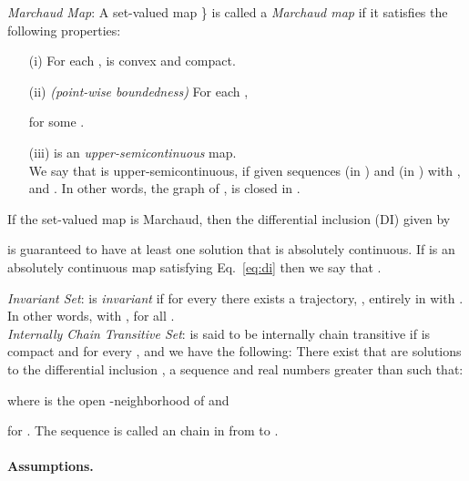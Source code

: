 \documentclass{article}
\begin{document}
\textit{Marchaud Map}: A set-valued map \}
is called a \textit{Marchaud map} if it satisfies
the following properties:
\begin{itemize}
 \item[(i)] For each ,  is convex and compact.
 \item[(ii)] \textit{(point-wise boundedness)} For each ,
 
for some .
 \item[(iii)]  is an \textit{upper-semicontinuous} map. \\ \indent
 We say that  is upper-semicontinuous,
  if given sequences  (in ) and
   (in )  with
  ,  and
  .
   In other words, the graph of
   ,
  is closed in .
\end{itemize}

If the set-valued map 
is  Marchaud, then
the differential inclusion (DI) given by

is guaranteed to have at least one solution that is absolutely continuous.
If  is an absolutely continuous map satisfying  Eq.~\eqref{eq:di} then we say that .

\textit{Invariant Set}:
 is \textit{invariant} if for every  there exists
a trajectory, , entirely in 
with .
In other words,  with ,
for all .
\\ \indent
\textit{Internally Chain Transitive Set}:
 is said to be
internally chain transitive if  is compact and for every ,
 and  we have the following: There exist  that
are  solutions to the differential inclusion ,
a sequence 
and  real numbers
 greater than  such that:

where  is the open -neighborhood of  and

for . The sequence 
is called an  chain in  from  to .



\paragraph{Assumptions.}
\end{document}
